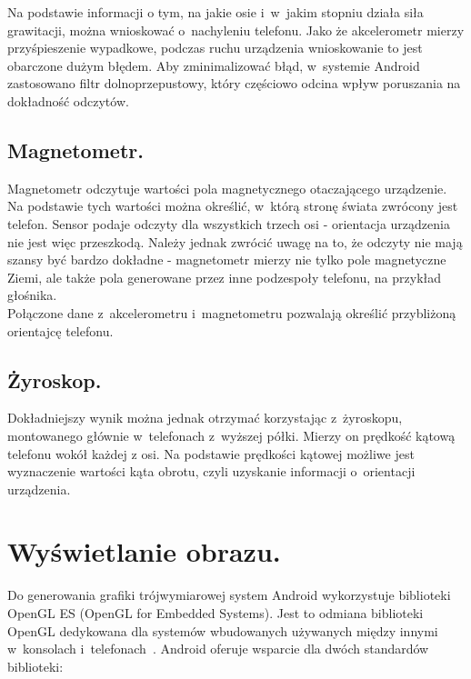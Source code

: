 \documentclass[a4paper,twocolumn,11pt]{article}
\begin{document}
 

 Na podstawie informacji o tym, na jakie osie i~w~jakim stopniu działa siła grawitacji, można wnioskować o~nachyleniu telefonu.
 Jako że akcelerometr mierzy przyśpieszenie wypadkowe, podczas ruchu urządzenia wnioskowanie to jest obarczone dużym błędem.
 Aby zminimalizować błąd, w~systemie Android zastosowano filtr dolnoprzepustowy, który częściowo odcina wpływ poruszania na dokładność odczytów.


\subsection{Magnetometr.}
 Magnetometr odczytuje wartości pola magnetycznego otaczającego urządzenie.
 Na podstawie tych wartości można określić, w~którą stronę świata zwrócony jest telefon.
 Sensor podaje odczyty dla wszystkich trzech osi - orientacja urządzenia nie jest więc przeszkodą.
 Należy jednak zwrócić uwagę na to, że odczyty nie mają szansy być bardzo dokładne - magnetometr mierzy nie tylko pole magnetyczne Ziemi, ale także pola generowane przez inne podzespoły telefonu, na przykład głośnika.\\


Połączone dane z~akcelerometru i~magnetometru pozwalają określić przybliżoną orientajcę telefonu.


\subsection{Żyroskop.}
 Dokładniejszy wynik można jednak otrzymać korzystając z~żyroskopu, montowanego głównie w~telefonach z~wyższej półki.
 Mierzy on prędkość kątową telefonu wokół każdej z osi.
 Na podstawie prędkości kątowej możliwe jest wyznaczenie wartości kąta obrotu, czyli uzyskanie informacji o~orientacji urządzenia.




\section{Wyświetlanie obrazu.} \label{sec:image_rendering}

Do generowania grafiki trójwymiarowej system Android wykorzystuje biblioteki OpenGL ES (OpenGL for Embedded Systems).
Jest to odmiana biblioteki OpenGL dedykowana dla systemów wbudowanych używanych między innymi w~konsolach i~telefonach~\cite{ogl:es}.
Android oferuje wsparcie dla dwóch standardów biblioteki:
\end{document}
